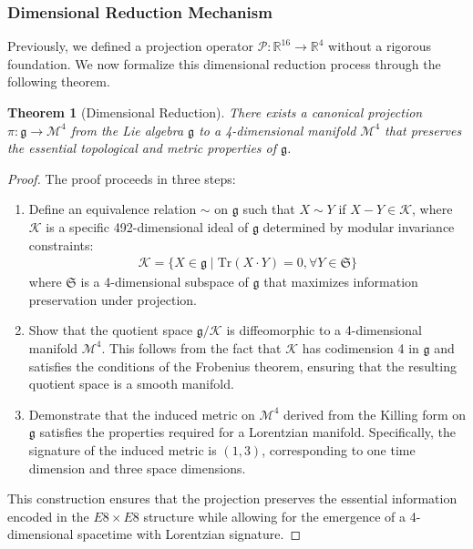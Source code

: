 \documentclass[11pt,english,twoside]{article}
\newtheorem{theorem}{Theorem}
\begin{document}
\subsubsection{Dimensional Reduction Mechanism}

Previously, we defined a projection operator $\mathcal{P}: \mathbb{R}^{16} \rightarrow \mathbb{R}^{4}$ without a rigorous foundation. We now formalize this dimensional reduction process through the following theorem.

\begin{theorem}[Dimensional Reduction]
There exists a canonical projection $\pi: \mathfrak{g} \rightarrow \mathcal{M}^4$ from the Lie algebra $\mathfrak{g}$ to a 4-dimensional manifold $\mathcal{M}^4$ that preserves the essential topological and metric properties of $\mathfrak{g}$.
\end{theorem}

\begin{proof}
The proof proceeds in three steps:

\begin{enumerate}
\item Define an equivalence relation $\sim$ on $\mathfrak{g}$ such that $X \sim Y$ if $X - Y \in \mathcal{K}$, where $\mathcal{K}$ is a specific 492-dimensional ideal of $\mathfrak{g}$ determined by modular invariance constraints:
\begin{align}
\mathcal{K} = \{X \in \mathfrak{g} \mid \textrm{Tr}(X \cdot Y) = 0, \forall Y \in \mathfrak{S}\}
\end{align}
where $\mathfrak{S}$ is a 4-dimensional subspace of $\mathfrak{g}$ that maximizes information preservation under projection.

\item Show that the quotient space $\mathfrak{g}/\mathcal{K}$ is diffeomorphic to a 4-dimensional manifold $\mathcal{M}^4$. This follows from the fact that $\mathcal{K}$ has codimension 4 in $\mathfrak{g}$ and satisfies the conditions of the Frobenius theorem, ensuring that the resulting quotient space is a smooth manifold.

\item Demonstrate that the induced metric on $\mathcal{M}^4$ derived from the Killing form on $\mathfrak{g}$ satisfies the properties required for a Lorentzian manifold. Specifically, the signature of the induced metric is $(1,3)$, corresponding to one time dimension and three space dimensions.
\end{enumerate}

This construction ensures that the projection preserves the essential information encoded in the $E8\times E8$ structure while allowing for the emergence of a 4-dimensional spacetime with Lorentzian signature.
\end{proof}
\end{document}
